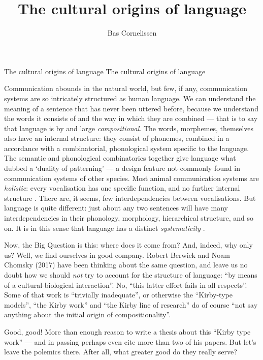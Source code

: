 \documentclass{../src/bcthesispart}
\title{The cultural origins of language}
\author{Bas Cornelissen}
\begin{document}
%
	{The cultural origins of language}%
	{The cultural origins of language}{}




\noindent
Communication abounds in the natural world, but few, if any, communication systems are so intricately structured as human language.
We can understand the meaning of a sentence that has never been uttered before, because we understand the words it consists of and the way in which they are combined — that is to say that language is by and large \emph{compositional}.
The words, morphemes, themselves also have an internal structure: they consist of phonemes, combined in a accordance with a combinatorial, phonological system specific to the language.\nocite{Zuidema2013}
The semantic and phonological combinatorics together give language what \textcite{Hockett1960} dubbed a ‘duality of patterning’ — a design feature not commonly found in communication systems of other species.
Most animal communication systems are \emph{holistic}: every vocalisation has one specific function, and no further internal structure \parencite{Zuidema2013}.
There are, it seems, few interdependencies between vocalisations.
But language is quite different: just about any two sentences will have many interdependencies in their phonology, morphology, hierarchical structure, and so on. 
It is in this sense that language has a distinct \emph{systematicity} \parencite{Kirby2017}.




Now, the Big Question is this: where does it come from? 
And, indeed, why only us?
Well, we find ourselves in good company.
Robert Berwick and Noam Chomsky (2017) \nocite{Berwick2017} have been thinking about the same question, and leave us no doubt how we should \emph{not} try to account for the structure of language: “by means of a cultural-biological interaction”.
No, “this latter effort fails in all respects”.
Some of that work is “trivially inadequate”, or otherwise the “Kirby-type models”, “the Kirby work” and “the Kirby line of research” do of course “not say anything about the initial origin of compositionality”.




Good, good! More than enough reason to write a thesis about this “Kirby type work” — and in passing perhaps even cite more than two of his papers. 
But let’s leave the polemics there. After all, what greater good do they really serve?
\end{document}
